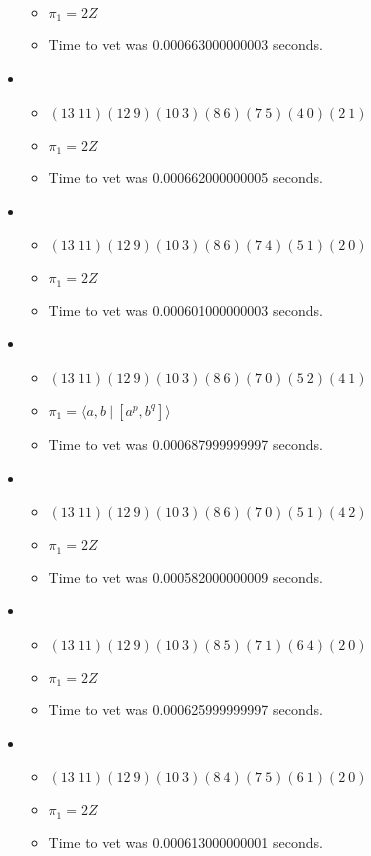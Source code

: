 \documentclass{article}
\begin{document}
\begin{itemize}
\begin{itemize}
      \item $\pi_1 =2 Z$
      \item Time to vet was 0.000663000000003 seconds.
\end{itemize}
\item \begin{itemize}
      \item $(13\ 11)(12\ 9)(10\ 3)(8\ 6)(7\ 5)(4\ 0)(2\ 1)$
      \item $\pi_1 =2 Z$
      \item Time to vet was 0.000662000000005 seconds.
\end{itemize}
\item \begin{itemize}
      \item $(13\ 11)(12\ 9)(10\ 3)(8\ 6)(7\ 4)(5\ 1)(2\ 0)$
      \item $\pi_1 =2 Z$
      \item Time to vet was 0.000601000000003 seconds.
\end{itemize}
\item \begin{itemize}
      \item $(13\ 11)(12\ 9)(10\ 3)(8\ 6)(7\ 0)(5\ 2)(4\ 1)$
      \item $\pi_1 = \langle a,b\ |\ [a^p,b^q]\rangle$
      \item Time to vet was 0.000687999999997 seconds.
\end{itemize}
\item \begin{itemize}
      \item $(13\ 11)(12\ 9)(10\ 3)(8\ 6)(7\ 0)(5\ 1)(4\ 2)$
      \item $\pi_1 =2 Z$
      \item Time to vet was 0.000582000000009 seconds.
\end{itemize}
\item \begin{itemize}
      \item $(13\ 11)(12\ 9)(10\ 3)(8\ 5)(7\ 1)(6\ 4)(2\ 0)$
      \item $\pi_1 =2 Z$
      \item Time to vet was 0.000625999999997 seconds.
\end{itemize}
\item \begin{itemize}
      \item $(13\ 11)(12\ 9)(10\ 3)(8\ 4)(7\ 5)(6\ 1)(2\ 0)$
      \item $\pi_1 =2 Z$
      \item Time to vet was 0.000613000000001 seconds.

\end{itemize}
\end{itemize}
\end{document}

